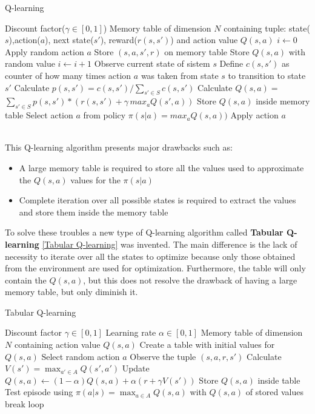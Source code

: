 \begin{algorithm} \label{Q-learning algo}
	\caption{Q-learning}
	\begin{algorithmic}
		\REQUIRE Discount factor($\gamma \in [0,1]$)
		\REQUIRE Memory table of dimension $N$ containing tuple: state($s$),action($a$), next state($s'$), reward($r(s,s')$) and action value $Q(s,a)$
		\STATE $i \leftarrow 0$ 
		\STATE Apply random action $a$
		\STATE Store $(s,a,s',r)$ on memory table
		\STATE Store $Q(s,a)$ with random value
		\STATE $i \leftarrow i+1$
		\ENDFOR
		\STATE Observe current state of sistem $s$
		\STATE Define $c(s, s')$ as counter of how many times action $a$ was taken from state $s$ to transition to state $s'$
		\STATE Calculate $p(s,s') = c(s,s')/ \sum_{s' \in S} c(s,s')$
		\STATE Calculate $Q(s,a) = $ $\sum_{s' \in S}p(s,s')*( r(s,s') + \gamma\,max_{a} Q(s',a))$
		\STATE Store $Q(s,a)$ inside memory table
		\STATE Select action $a$ from policy $\pi(s|a) = max_{a} Q(s,a))$
		\STATE Apply action $a$
		\ENDWHILE
	\end{algorithmic}
\end{algorithm}\\
This Q-learning algorithm presents major drawbacks such as:
\begin{itemize}
	\item A large memory table is required to store all the values used to approximate the $Q(s, a)$ values for the $\pi(s|a)$
	\item  Complete iteration over all possible states is required to extract the values and store them inside the memory table
\end{itemize} 
To solve these troubles a new type of Q-learning algorithm called \textbf{Tabular Q-learning} \ref{Tabular Q-learning} was invented. The main difference is the lack of necessity to iterate over all the states to optimize because only those obtained from the environment are used for optimization. Furthermore, the table will only contain the $Q(s, a)$, but this does not resolve the drawback of having a large memory table, but only diminish it.
\begin{algorithm} \label{Tabular Q-learning}
	\caption{Tabular Q-learning}
	\begin{algorithmic}
		\REQUIRE Discount factor $\gamma \in [0,1]$
		\REQUIRE Learning rate  $\alpha \in  [0,1]$
		\REQUIRE Memory table of dimension $N$ containing action value $Q(s,a)$
		\LOOP
		\STATE Create a table with initial values for $Q(s,a)$  
		\STATE Select random action $a$
		\STATE Observe the tuple $(s,a,r,s')$
		\STATE Calculate $V(s') = \max_{a' \in A} Q(s',a')$
		\STATE Update $Q(s,a) \leftarrow (1-\alpha) Q(s,a) + \alpha (r + \gamma V(s'))$
		\STATE Store $Q(s,a)$ inside table
		\STATE Test episode using $\pi(a|s) = \max_{a \in A} Q(s,a)$ with $Q(s,a)$ of stored values 
		\IF {goal is reached}
		\STATE break loop
		\ENDIF
		\ENDLOOP
	\end{algorithmic}
\end{algorithm}\\
